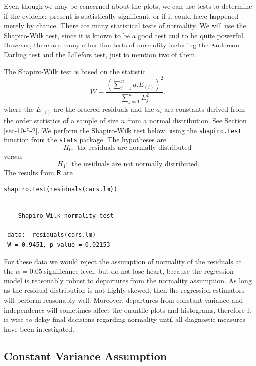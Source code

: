 \documentclass[captions=tableheading]{scrbook}
\begin{document}
Even though we may be concerned about the plots, we can use tests to determine if the evidence present is statistically significant, or if it could have happened merely by chance. There are many statistical tests of normality. We will use the Shapiro-Wilk test, since it is known to be a good test and to be quite powerful. However, there are many other fine tests of normality including the Anderson-Darling test and the Lillefors test, just to mention two of them.  

The Shapiro-Wilk test is based on the statistic
\begin{equation}
W=\frac{\left(\sum_{i=1}^{n}a_{i}E_{(i)}\right)^{2}}{\sum_{j=1}^{n}E_{j}^{2}},
\end{equation}
where the \(E_{(i)}\) are the ordered residuals and the \(a_{i}\) are constants derived from the order statistics of a sample of size \(n\) from a normal distribution. See Section \ref{sec-10-5-2}.
We perform the Shapiro-Wilk test below, using the \texttt{shapiro.test} function from the \texttt{stats} package. The hypotheses are
\[
H_{0}:\mbox{ the residuals are normally distributed }
\]
versus
\[
H_{1}:\mbox{ the residuals are not normally distributed.}
\]
The results from \(\mathsf{R}\) are


\lstset{language=R}
\begin{lstlisting}
shapiro.test(residuals(cars.lm))
\end{lstlisting}

\begin{verbatim}
 
 	Shapiro-Wilk normality test
 
 data:  residuals(cars.lm) 
 W = 0.9451, p-value = 0.02153
\end{verbatim}

For these data we would reject the assumption of normality of the residuals at the \(\alpha=0.05\) significance level, but do not lose heart, because the regression model is reasonably robust to departures from the normality assumption. As long as the residual distribution is not highly skewed, then the regression estimators will perform reasonably well. Moreover, departures from constant variance and independence will sometimes affect the quantile plots and histograms, therefore it is wise to delay final decisions regarding normality until all diagnostic measures have been investigated.
\subsection{Constant Variance Assumption}
\label{sec-11-4-2}
\label{sub-Constant-Variance-Assumption}
\end{document}
